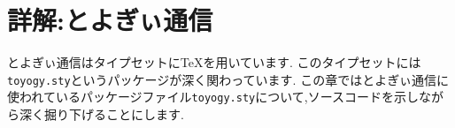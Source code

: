 \section{詳解:とよぎぃ通信}
とよぎぃ通信はタイプセットに{\TeX}を用いています.
このタイプセットには\texttt{toyogy.sty}というパッケージが深く関わっています.
この章ではとよぎぃ通信に使われているパッケージファイル\texttt{toyogy.sty}について,ソースコードを示しながら深く掘り下げることにします.




